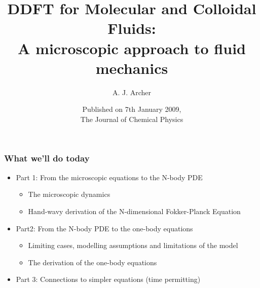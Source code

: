 \documentclass[aspectratio=169,xcolor=dvipsnames]{beamer}
\begin{document}
\title[]{DDFT for Molecular and Colloidal Fluids:\\
A microscopic approach to fluid mechanics}
\author[]{A. J. Archer}
\date{Published on 7th January 2009, \\ The Journal of Chemical Physics}

\begin{frame}
\titlepage
\end{frame}
 
 
\begin{frame}
	\frametitle{What we'll do today}
	 
	 \begin{itemize}
	 	\item Part 1: From the microscopic equations to the N-body PDE
	 	\vspace{0.1 cm}
	 	\begin{itemize}
	 	\item The microscopic dynamics
	 	\item Hand-wavy derivation of the N-dimensional Fokker-Planck Equation
	 	\end{itemize}
 	    \vspace{0.2 cm}
	 	\item Part2: From the N-body PDE to the one-body equations
	 	\vspace{0.1 cm}
	 	\begin{itemize}
	 		\item Limiting cases, modelling assumptions and limitations of the model
	 		\item The derivation of the one-body equations
	 	\end{itemize}
     	\vspace{0.2 cm}
        \item Part 3: Connections to simpler equations (time permitting)
	 \end{itemize}
\end{frame}
\end{document}
